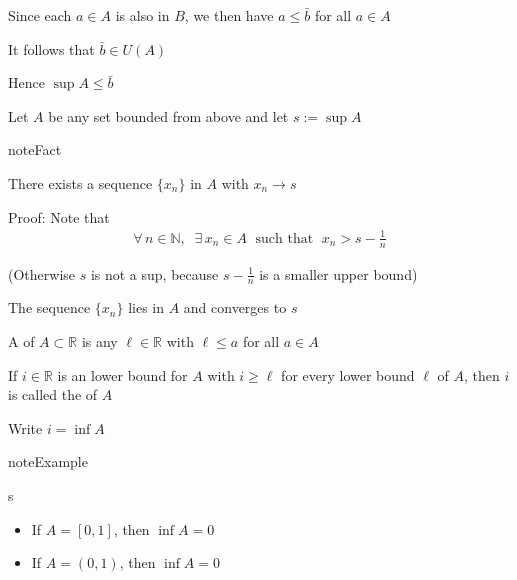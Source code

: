 \documentclass[letterpaper,10pt,english]{jupyterBook}
\begin{document}
\sphinxAtStartPar
Since each \(a \in A\) is also in \(B\), we then have \(a \leq \bar b\) for all \(a \in A \)

\sphinxAtStartPar
It follows that \(\bar b \in U(A)\)

\sphinxAtStartPar
Hence \(\sup A \leq \bar b\)

\sphinxAtStartPar
Let \(A\) be any set bounded from above and let \(s := \sup A\)

\begin{sphinxadmonition}{note}{Fact}

\sphinxAtStartPar
There exists a sequence \(\{x_n\}\) in \(A\) with \(x_n \to s\)
\end{sphinxadmonition}

\sphinxAtStartPar
Proof: Note that
\begin{equation*}
\begin{split}
%
\forall \, n \in \mathbb{N}, \;\; \exists \, x_n \in A \; \text{ such that } \; x_n > s - \frac{1}{n}
%
\end{split}
\end{equation*}
\begin{figure}[htbp]
\centering

\noindent{}
\end{figure}

\sphinxAtStartPar
(Otherwise \(s\) is not a sup, because \(s-\frac{1}{n}\) is a smaller upper bound)

\sphinxAtStartPar
The sequence \(\{x_n\}\) lies in \(A\) and converges to \(s\)

\sphinxAtStartPar
A  of \(A \subset \mathbb{R}\) is any \(\ell \in \mathbb{R}\) with \(\ell \leq a\) for all \(a \in A\)

\sphinxAtStartPar
If \(i \in \mathbb{R}\) is an lower bound for \(A\) with \(i \geq \ell\) for every
lower bound \(\ell\) of \(A\), then \(i\) is called the
 of \(A\)

\sphinxAtStartPar
Write \(i = \inf A\)

\begin{sphinxadmonition}{note}{Example}

\sphinxAtStartPar
s
\end{sphinxadmonition}
\begin{itemize}
\item {} 
\sphinxAtStartPar
If \(A = [0, 1]\), then \(\inf A = 0\)

\item {} 
\sphinxAtStartPar
If \(A = (0, 1)\), then \(\inf A = 0\)

\end{itemize}
\end{document}
